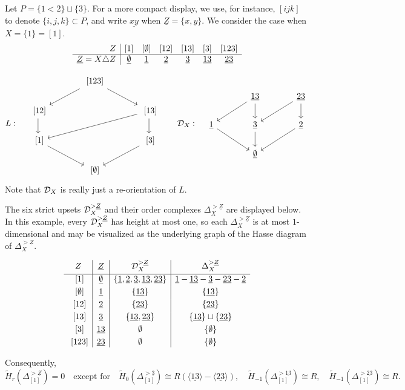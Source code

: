 \documentclass[a4paper,leqno]{amsart}
\begin{document}
\begin{eg}\label{subsec:eg1}
Let $P=\{1<2\}\sqcup\{3\}$.  For a more compact display, we use, for instance, $[ijk]$ to denote $\{i,j,k\}\subset P$, and write $\underline{xy}$ when $\underline{Z}=\{x,y\}$. We consider the case when $X=\{1\}=[1]$.
\[
\begin{array}{r|cccccc}
 Z&[1]&[\emptyset]&[12]&[13]&[3]&[123]\\ \hline
 \underline{Z} = X{\mathbin{\triangle}} Z&\underline{\emptyset}&\underline{1}&\underline{2}&\underline{3}&\underline{13}&\underline{23}
\end{array}
\]

\[
L: \quad \begin{tikzcd}[column sep=large]
 & \ [123]\ar[ld]\ar[rd] & \\
\ [12] \ar[d] & & \ [13] \ar[d]\ar[lld] \\
\ [1] \ar[rd] & & \ [3] \ar[ld] \\
& \ [\emptyset] &
\end{tikzcd} \qquad
\D_X: \quad \begin{tikzcd}[column sep=large]
 & \underline{13}\ar[ld]\ar[d] & \underline{23}\ar[d]\ar[dl] \\
 \underline{1}\ar[rd] & \underline{3}\ar[d] & \underline{2}\ar[ld] \\
 & \underline{\emptyset} &
\end{tikzcd}
\]
Note that $\mathcal D_X$ is really just a re-orientation of $L$.

The six strict upsets $\mathcal D_X^{>\underline{Z}}$ and their order complexes $\Delta_X^{>\underline{Z}}$ are displayed below. In this example, every $\mathcal D_X^{>\underline{Z}}$ has height at most one, so each $\Delta_X^{>\underline{Z}}$ is at most $1$-dimensional and may be visualized as the underlying graph of the Hasse diagram of $\Delta_X^{> \underline{Z}}$.

\[
\begin{array}{c|c|c|c}
 Z& \underline{Z} & \mathcal D_X^{>\underline{Z}}&\Delta_X^{>\underline{Z}}\\[1mm] \hline
 \ [1]&\underline{\emptyset} &\{\underline{1},\underline{2},\underline{3},\underline{13},\underline{23}\}&
 \underline{1}-\underline{13}-\underline{3}-\underline{23}-\underline{2}\\[1mm]
 \ [\emptyset]& \underline{1}&\{\underline{13}\}& \{\underline{13}\} \\[1mm]
 \ [12]& \underline{2}&\{\underline{23}\}& \{\underline{23}\} \\[1mm]
 \ [13]& \underline{3}&\{\underline{13}, \underline{23}\}&  \{\underline{13}\}\sqcup\{\underline{23}\}\\[1mm]
 \ [3]& \underline{13}&{\emptyset}&\{\emptyset\}\\[1mm]
 \ [123]& \underline{23}&{\emptyset}&\{\emptyset\}
\end{array}
\]

Consequently,
\[
 \widetilde H_r(\Delta^{>\underline{Z}}_{[1]})=0
 \quad\text{except for}\quad
 \widetilde H_0(\Delta^{>\underline{3}}_{[1]})\cong R(\langle \underline{13}\rangle -  \langle\underline{23}\rangle),
 \quad
 \widetilde H_{-1}(\Delta^{>\underline{13}}_{[1]})\cong R,
 \quad
 \widetilde H_{-1}(\Delta^{>\underline{23}}_{[1]})\cong R.
\]
\end{eg}
\end{document}
